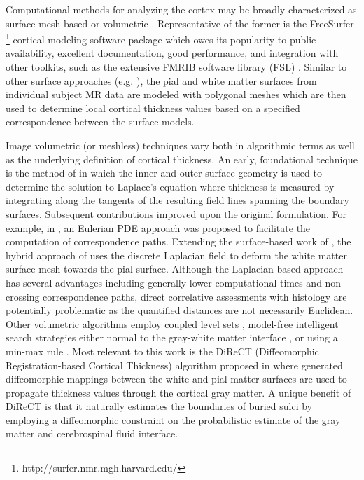 Computational methods for analyzing the cortex may be 
broadly characterized as surface mesh-based or volumetric \citep{scott2009,clarkson2011}.  Representative of the former is the
FreeSurfer%
\footnote{
http://surfer.nmr.mgh.harvard.edu/
}
cortical modeling software package \citep{dale1999,fischl1999,fischl2000,fischl2002,fischl2004}
which owes its popularity to public availability, excellent documentation, 
good performance, and  integration with other toolkits, such as the extensive FMRIB software 
library (FSL) \citep{smith2004}.  Similar to other surface
approaches (e.g. \cite{davatzikos1996,magnotta1999,macdonald2000,kim2005}), the pial
and white matter surfaces from individual subject MR data are modeled with polygonal meshes  
which are then used to determine local cortical thickness values based on a specified correspondence between 
the surface models.

Image volumetric (or meshless) techniques vary both in algorithmic terms as well as
the underlying definition of cortical thickness.  An early, foundational technique is the 
method of \cite{jones2000} in which the inner and outer surface geometry is used to determine the
solution to Laplace's equation where thickness is measured by integrating along the 
tangents of the resulting field lines spanning the boundary surfaces.  Subsequent contributions
improved upon the original formulation.  For example, in \cite{yezzi2003}, an Eulerian PDE approach
was proposed to facilitate the computation of correspondence paths.  Extending the surface-based
work of \cite{macdonald2000}, the hybrid approach of
\cite{kim2005} uses the discrete Laplacian field to deform the white matter surface mesh towards the 
pial surface.    Although the Laplacian-based approach has several advantages
including generally lower computational times and 
non-crossing correspondence paths, direct correlative assessments with histology
are potentially problematic as the quantified distances 
are not necessarily Euclidean.  Other volumetric algorithms employ coupled
level sets \citep{zeng1999}, model-free intelligent search strategies either normal to 
the gray-white matter interface \citep{scott2009}, or using a min-max rule \citep{clement-vachet2011}.
Most relevant to this work is the DiReCT (Diffeomorphic Registration-based 
Cortical Thickness) algorithm proposed in \cite{das2009} where generated
diffeomorphic mappings between the 
white and pial matter surfaces are used to propagate thickness values 
through the cortical gray matter.  A unique benefit of DiReCT is that it
naturally estimates the boundaries of buried sulci by employing a
diffeomorphic constraint on the probabilistic estimate of the gray
matter and cerebrospinal fluid interface.  

